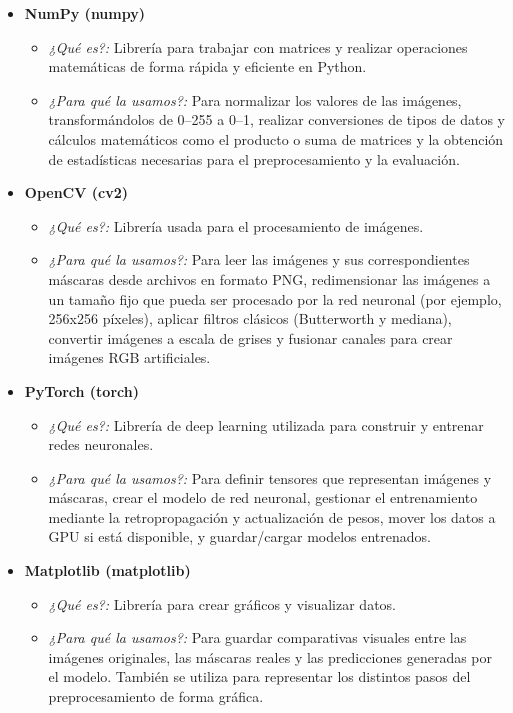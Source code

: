 \documentclass[12pt]{article}
\begin{document}
\begin{itemize}

    \item \textbf{NumPy (numpy)} \cite{numpy}
    \begin{itemize}
        \item \textit{¿Qué es?:} Librería para trabajar con matrices y realizar operaciones matemáticas de forma rápida y eficiente en Python.
        \item \textit{¿Para qué la usamos?:} Para normalizar los valores de las imágenes, transformándolos de 0--255 a 0--1, realizar conversiones de tipos de datos y cálculos matemáticos como el producto o suma de matrices y la obtención de estadísticas necesarias para el preprocesamiento y la evaluación.
    \end{itemize}
    
    \item \textbf{OpenCV (cv2)} \cite{opencv}
    \begin{itemize}
        \item \textit{¿Qué es?:} Librería usada para el procesamiento de imágenes.
        \item \textit{¿Para qué la usamos?:} Para leer las imágenes y sus correspondientes máscaras desde archivos en formato PNG, redimensionar las imágenes a un tamaño fijo que pueda ser procesado por la red neuronal (por ejemplo, 256x256 píxeles), aplicar filtros clásicos (Butterworth y mediana), convertir imágenes a escala de grises y fusionar canales para crear imágenes RGB artificiales.
    \end{itemize}

    \item \textbf{PyTorch (torch)} \cite{pytorch}
    \begin{itemize}
        \item \textit{¿Qué es?:} Librería de deep learning utilizada para construir y entrenar redes neuronales.
        \item \textit{¿Para qué la usamos?:} Para definir tensores que representan imágenes y máscaras, crear el modelo de red neuronal, gestionar el entrenamiento mediante la retropropagación y actualización de pesos, mover los datos a GPU si está disponible, y guardar/cargar modelos entrenados.
    \end{itemize}

    \item \textbf{Matplotlib (matplotlib)} \cite{matplotlib}
    \begin{itemize}
        \item \textit{¿Qué es?:} Librería para crear gráficos y visualizar datos.
        \item \textit{¿Para qué la usamos?:} Para guardar comparativas visuales entre las imágenes originales, las máscaras reales y las predicciones generadas por el modelo. También se utiliza para representar los distintos pasos del preprocesamiento de forma gráfica.
    \end{itemize}


\end{itemize}
\end{document}
